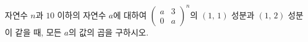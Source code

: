 \hspace*{2mm}\begin{minipage}[t]{\dimexpr\linewidth-2mm\relax}\vspace{0pt}
자연수 $n$과 $10$ 이하의 자연수 $a$에 대하여 $\begin{pmatrix} a & 3 \\ 0 & a \end{pmatrix}^n$의 $(1,\,1)$ 성분과 $(1,\,2)$ 성분이 같을 때, 모든 $a$의 값의 곱을 구하시오.\end{minipage}

